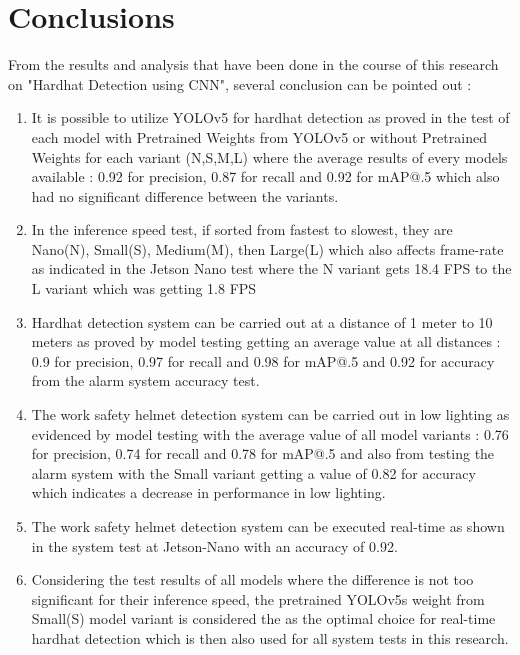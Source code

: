 \section{Conclusions}
\label{sec:kesimpulan}

\par From the results and analysis that have been done in the course of this research on "Hardhat Detection using CNN", several conclusion can be pointed out :

\begin{enumerate}[nolistsep]

    \item It is possible to utilize YOLOv5 for hardhat detection as proved in the test of each model with Pretrained Weights from YOLOv5 or without Pretrained Weights for each variant (N,S,M,L) where the average results of every models available : 0.92 for precision,  0.87 for recall and 0.92 for mAP@.5 which also had no significant difference between the variants.

    \item In the inference speed test, if sorted from fastest to slowest, they are Nano(N), Small(S), Medium(M), then Large(L) which also affects frame-rate as indicated in the Jetson Nano test where the N variant gets 18.4 FPS to the L variant which was getting 1.8 FPS

    \item Hardhat detection system can be carried out at a distance of 1 meter to 10 meters as proved by model testing getting an average value at all distances : 0.9 for precision,  0.97 for recall and 0.98 for mAP@.5 and 0.92 for accuracy from the alarm system accuracy test.

    \item The work safety helmet detection system can be carried out in low lighting as evidenced by model testing with the average value of all model variants : 0.76 for precision,  0.74 for recall and 0.78 for mAP@.5 and also from testing the alarm system with the Small variant getting a value of 0.82 for accuracy which indicates a decrease in performance in low lighting.

    \item The work safety helmet detection system can be executed real-time as shown in the system test at Jetson-Nano with an accuracy of 0.92.

    \item Considering the test results of all models where the difference is not too significant for their inference speed, the pretrained YOLOv5s weight from Small(S) model variant is considered the as the optimal choice for real-time hardhat detection which is then also used for all system tests in this research.
    
\end{enumerate}


